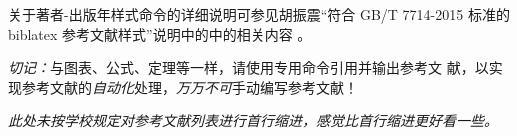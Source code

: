 \documentclass{ctexbook}
\newcommand{\note}[1]{{%
  \color{magenta}{\bfseries 注意：}\emph{#1}}}
\begin{document}
关于著者-出版年样式命令的详细说明可参见胡振震\enquote{符合 GB/T
  7714-2015 标准的 biblatex 参考文献样式}说明中的中的相关内容
\parencite[2.2、2.3节]{胡振震2016}。

\emph{切记：}与图表、公式、定理等一样，请使用专用命令引用并输出参考文
献，以实现参考文献的\emph{自动化}处理，\emph{万万不可}手动编写参考文献！

\nocite{广西壮族自治区林业厅1993--,r4,张若凌2004--,于潇2012-1518-1523,马克思2013-302-302,张田勤2000--,萧钰2001--,刘加林1993--,张志祥1998--,n42,n43}
\printbibliography[heading=bibintoc]%

\note{此处未按学校规定对参考文献列表进行首行缩进，感觉比首行缩进更好看一些。}

\end{document}
